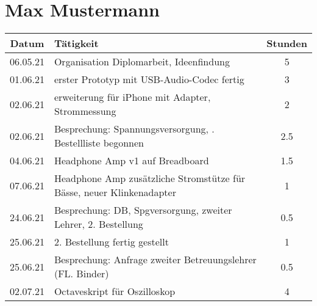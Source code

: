 \section{Max Mustermann}
\begin{longtable}{c|p{10cm}|c}
    \textbf{Datum} & \textbf{Tätigkeit}                                                                                            & \textbf{Stunden} \\ \hline \hline
    06.05.21       & Organisation Diplomarbeit, Ideenfindung                                                                       & 5                \\ \hline
    01.06.21       & erster Prototyp mit USB-Audio-Codec fertig                                                                    & 3                \\ \hline
    02.06.21       & erweiterung für iPhone mit Adapter, Strommessung                                                              & 2                \\ \hline
    02.06.21       & Besprechung: Spannungsversorgung, \newline 1. Bestellliste begonnen                                           & 2.5              \\ \hline
    04.06.21       & Headphone Amp v1 auf Breadboard                                                                               & 1.5              \\ \hline
    07.06.21       & Headphone Amp zusätzliche Stromstütze für Bässe, \newline neuer   Klinkenadapter                              & 1                \\ \hline
    24.06.21       & Besprechung: DB, Spgversorgung, \newline zweiter Lehrer, 2. Bestellung                                        & 0.5              \\ \hline
    25.06.21       & 2. Bestellung fertig gestellt                                                                                 & 1                \\ \hline
    25.06.21       & Besprechung: Anfrage \newline zweiter Betreuungslehrer (FL. Binder)                                           & 0.5              \\ \hline
    02.07.21       & Octaveskript für Oszilloskop                                                                                  & 4                \\ \hline

\end{longtable}
